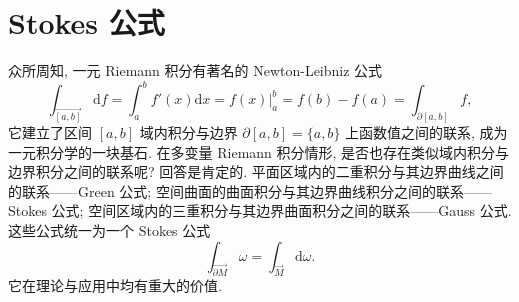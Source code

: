\section{Stokes 公式}

众所周知, 一元 Riemann 积分有著名的 Newton-Leibniz 公式
\[
\int_{\overrightarrow{[a,b]}}\mathrm{d}f=\int_{a}^{b}f'(x)\mathrm{d}x=f(x)\Big|_{a}^{b}=f(b)-f(a)=\int_{\partial[a,b]}f,
\]
它建立了区间 $[a,b]$ 域内积分与边界 $\partial[a,b]=\{a,b\}$ 上函数值之间的联系, 成为一元积分学的一块基石. 在多变量 Riemann 积分情形, 是否也存在类似域内积分与边界积分之间的联系呢? 回答是肯定的. 平面区域内的二重积分与其边界曲线之间的联系——Green 公式; 空间曲面的曲面积分与其边界曲线积分之间的联系——Stokes 公式; 空间区域内的三重积分与其边界曲面积分之间的联系——Gauss 公式. 这些公式统一为一个 Stokes 公式
\[
\int_{\overrightarrow{\partial M}}\omega=\int_{\overrightarrow{M}}\mathrm{d}\omega.
\]
它在理论与应用中均有重大的价值.

